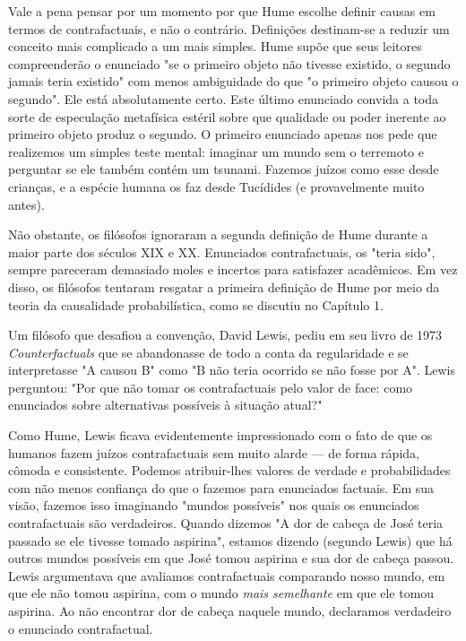 \documentclass[11pt,a5paper,twoside]{book}
\begin{document}
Vale a pena pensar por um momento por que Hume escolhe definir causas em termos de contrafactuais, e não o contrário. Definições destinam-se a reduzir um conceito mais complicado a um mais simples. Hume supõe que seus leitores compreenderão o enunciado "se o primeiro objeto não tivesse existido, o segundo jamais teria existido" com menos ambiguidade do que "o primeiro objeto causou o segundo". Ele está absolutamente certo. Este último enunciado convida a toda sorte de especulação metafísica estéril sobre que qualidade ou poder inerente ao primeiro objeto produz o segundo. O primeiro enunciado apenas nos pede que realizemos um simples teste mental: imaginar um mundo sem o terremoto e perguntar se ele também contém um tsunami. Fazemos juízos como esse desde crianças, e a espécie humana os faz desde Tucídides (e provavelmente muito antes).

Não obstante, os filósofos ignoraram a segunda definição de Hume durante a maior parte dos séculos XIX e XX. Enunciados contrafactuais, os "teria sido", sempre pareceram demasiado moles e incertos para satisfazer acadêmicos. Em vez disso, os filósofos tentaram resgatar a primeira definição de Hume por meio da teoria da causalidade probabilística, como se discutiu no Capítulo 1.

Um filósofo que desafiou a convenção, David Lewis, pediu em seu livro de 1973 \textit{Counterfactuals} que se abandonasse de todo a conta da regularidade e se interpretasse "A causou B" como "B não teria ocorrido se não fosse por A". Lewis perguntou: "Por que não tomar os contrafactuais pelo valor de face: como enunciados sobre alternativas possíveis à situação atual?"

Como Hume, Lewis ficava evidentemente impressionado com o fato de que os humanos fazem juízos contrafactuais sem muito alarde — de forma rápida, cômoda e consistente. Podemos atribuir-lhes valores de verdade e probabilidades com não menos confiança do que o fazemos para enunciados factuais. Em sua visão, fazemos isso imaginando "mundos possíveis" nos quais os enunciados contrafactuais são verdadeiros. Quando dizemos "A dor de cabeça de José teria passado se ele tivesse tomado aspirina", estamos dizendo (segundo Lewis) que há outros mundos possíveis em que José tomou aspirina e sua dor de cabeça passou. Lewis argumentava que avaliamos contrafactuais comparando nosso mundo, em que ele não tomou aspirina, com o mundo \textit{mais semelhante} em que ele tomou aspirina. Ao não encontrar dor de cabeça naquele mundo, declaramos verdadeiro o enunciado contrafactual.
\end{document}
